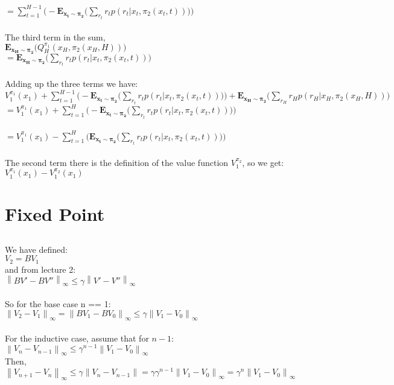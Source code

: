 \documentclass[10pt,a4paper]{article}
\newcommand{\norm}[1]{\left\lVert#1\right\rVert}
\begin{document}
    $=\sum\limits_{t=1}^{H-1}\Big(-\mathbf{E_{x_t\sim\pi_2}}\big(\sum\limits_{r_t} r_t p(r_t|x_t,\pi_2(x_t,t))\big)\Big)$ \\  \\
  The third term in the sum, \\
  $\mathbf{E_{x_H\sim\pi_2}}\big(Q_H^{\pi_1}(x_H,\pi_2(x_H,H))\big)$ \\
  $= \mathbf{E_{x_H\sim\pi_2}}\big(\sum\limits_{r_t} r_t p(r_t|x_t, \pi_2(x_t,t))\big)$ \\ \\
  Adding up the three terms we have: \\
  $V_1^{\pi_1}(x_1) + \sum\limits_{t=1}^{H-1}\Big(-\mathbf{E_{x_t\sim\pi_2}}\big(\sum\limits_{r_t} r_t p(r_t|x_t,\pi_2(x_t,t))\big)\Big) + \mathbf{E_{x_H\sim\pi_2}}\big(\sum\limits_{r_H} r_H p(r_H|x_H, \pi_2(x_H,H))\big)$ \\
  $= V_1^{\pi_1}(x_1) + \sum\limits_{t=1}^{H}\Big(-\mathbf{E_{x_t\sim\pi_2}}\big(\sum\limits_{r_t} r_t p(r_t|x_t,\pi_2(x_t,t))\big)\Big)$ \\ \\
  $= V_1^{\pi_1}(x_1) - \sum\limits_{t=1}^{H}\Big(\mathbf{E_{x_t\sim\pi_2}}\big(\sum\limits_{r_t} r_t p(r_t|x_t,\pi_2(x_t,t))\big)\Big)$ \\ \\  
  The second term there is the definition of the value function $V_1^{\pi_2}$, so we get: \\
  $V_1^{\pi_1}(x_1) - V_1^{\pi_2}(x_1)$
  
 \section{Fixed Point}
\subsection{}
We have defined: \\
$V_2 = BV_1$ \\
and from lecture 2: \\
$\norm{ BV' - BV'' }_{\infty} \leq \gamma \norm{ V'-V'' }_{\infty}$ \\
\\
So for the base case n == 1: \\
$\norm{ V_2 - V_1 }_{\infty} = \norm{ BV_1 - BV_0 }_{\infty} \leq \gamma\norm{ V_1 - V_0 }_{\infty}$ \\
\\
For the inductive case, assume that for $n - 1$: \\
$\norm{ V_n - V_{n - 1} }_\infty \leq \gamma^{n - 1} \norm{ V_1 - V_0 }_\infty $ \\
Then,
$\norm{ V_{n+1} - V_n }_\infty \leq \gamma\norm{ V_n - V_{n-1} } = \gamma \gamma^{n - 1} \norm{ V_1 - V_0 }_\infty = \gamma^n\norm{ V_1 - V_0 }_\infty$
\end{document}
